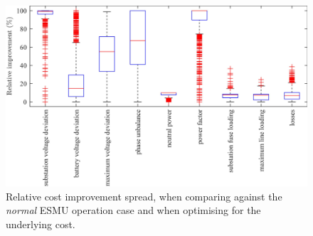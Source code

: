 \begin{figure}\centering
	\includegraphics[width=\textwidth]{_chapter1/fig/results/boxplot-relative-improvements}
\caption{Relative cost improvement spread, when comparing against the \textit{normal} ESMU operation case and when optimising for the underlying cost.}
\label{ch1:fig:boxplot-relative-improvements}
\end{figure}